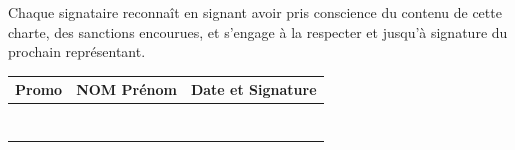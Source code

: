 \documentclass[11pt, a4paper]{article}
\begin{document}
\vspace{.5cm}

\noindent Chaque signataire reconnaît en signant avoir pris conscience du contenu de cette charte, des sanctions encourues, et s'engage à la respecter et jusqu'à signature du prochain représentant.

\begin{table}[h]
	\centering
	\renewcommand{\arraystretch}{2}
	\small{
		\begin{tabular}{|p{1.5cm}|p{7cm}|p{7cm}|}
			\hline
			\rowcolor{black!10} Promo & NOM Prénom & Date et Signature \\
			\hline
			                          &            &                   \\
			\hline
			                          &            &                   \\
			\hline
			                          &            &                   \\
			\hline
			                          &            &                   \\
			\hline
			                          &            &                   \\
			\hline
			                          &            &                   \\
			\hline
			                          &            &                   \\
			\hline
		\end{tabular}
	}
\end{table}
\end{document}
